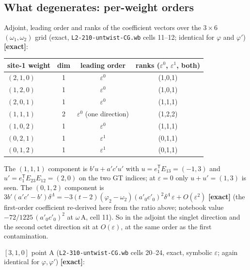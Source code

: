 \documentclass[10pt]{article}
\newcommand{\nb}[1]{\texttt{#1}}
\begin{document}
\subsection{What degenerates: per-weight orders}\label{sec:weights}

Adjoint, leading order and ranks of the coefficient vectors over the $3\times6$ $(\omega_1,\omega_2)$ grid (exact, \nb{L2-\allowbreak{}210-\allowbreak{}untwist-\allowbreak{}CG.\allowbreak{}wb} cells 11--12; identical for $\varphi$ and $\varphi'$) \textbf{[exact]}:

\begin{center}\small\setlength{\tabcolsep}{3pt}\begin{longtable}{@{}lccc@{}}\toprule
\textbf{site-1 weight} & \textbf{dim} & \textbf{leading order} & \textbf{ranks ($\varepsilon^0$, $\varepsilon^1$, both)} \\\midrule\endhead
$(2,1,0)$ & 1 & $\varepsilon^0$ & (1,0,1) \\
$(1,2,0)$ & 1 & $\varepsilon^0$ & (1,0,1) \\
$(2,0,1)$ & 1 & $\varepsilon^0$ & (1,1,1) \\
$(1,1,1)$ & 2 & $\varepsilon^0$ (one direction) & (1,2,2) \\
$(1,0,2)$ & 1 & $\varepsilon^0$ & (1,1,1) \\
$(0,2,1)$ & 1 & $\varepsilon^1$ & (0,1,1) \\
$(0,1,2)$ & 1 & $\varepsilon^1$ & (0,1,1) \\
\bottomrule\end{longtable}\end{center}

The $(1,1,1)$ component is $b'u+a'c'u'$ with $u=e_1^{\mathsf T}E_{13}=(-1,3)$ and $u'=e_1^{\mathsf T}E_{23}E_{12}=(2,0)$ on the two GT indices; at $\varepsilon=0$ only $u+u'=(1,3)$ is seen. The $(0,1,2)$ component is $3b'(a'c'-b')\delta^\Lambda=-3(t-2)(\varphi_2-\omega_2)(a'_0c'_0)^2\delta^\Lambda\,\varepsilon+O(\varepsilon^2)$ \textbf{[exact]} (the first-order coefficient re-derived here from the ratio above; notebook value $-72/1225\,(a'_0c'_0)^2$ at $\omega\,\mathrm{A}$, cell 11). So in the adjoint the singlet direction and the second octet direction sit at $O(\varepsilon)$, at the same order as the first contamination.

$[3,1,0]$ point A (\nb{L2-\allowbreak{}310-\allowbreak{}untwist-\allowbreak{}CG.\allowbreak{}wb} cells 20--24, exact, symbolic $\varepsilon$; again identical for $\varphi,\varphi'$) \textbf{[exact]}:
\end{document}
